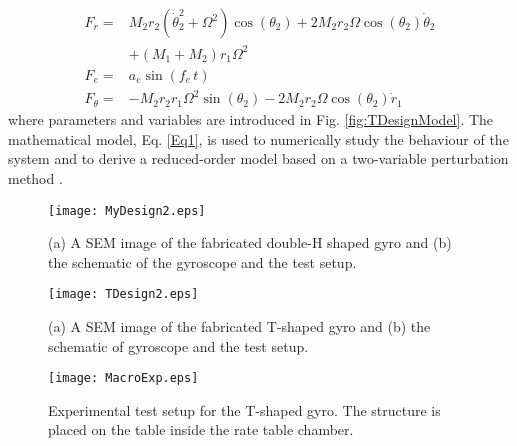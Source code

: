 \documentclass[twoside]{article}
\begin{document}
\begin{align}
F_r      = &  M_2 r_2 \left(\dot{\theta}_2^2 + \Omega^2 \right) \cos\left(\theta_2\right) + 2 M_2 r_2 \Omega \cos\left(\theta_2\right) \dot{\theta}_2 \nonumber\\
           &  + \left(M_1 + M_2 \right) r_1 \Omega^2 \nonumber \\
F_e  =  &   a_e \sin\left(f_e \, t\right) \nonumber \\
F_\theta =  &  -M_2  r_2 r_1  \Omega^2  \sin(\theta_2) - 2 M_2  r_2 \Omega \cos(\theta_2) \dot{r}_1 \nonumber
\end{align}
where parameters and variables are introduced in Fig. \ref{fig:TDesignModel}. The mathematical model, Eq. \eqref{Eq1}, is used to numerically study the behaviour of the system and to derive a reduced-order model based on a two-variable perturbation method \cite{Golnaraghi1989}. 

\begin{figure}[!b!] %
	\begin{center}
		\texttt{[image: MyDesign2.eps]}
		\caption{(a) A SEM image of the fabricated double-H shaped gyro and (b) the schematic of the gyroscope and the test setup.}
		\label{fig:MyDesign2}
	\end{center}
\end{figure}

\begin{figure}[!t!] %
	\begin{center}
		\texttt{[image: TDesign2.eps]}
		\caption{(a) A SEM image of the fabricated T-shaped gyro and (b) the schematic of gyroscope and the test setup.}
		\label{fig:TDesign2}
	\end{center}
\end{figure}


\begin{figure}[!h!] %
	\begin{center}
		\texttt{[image: MacroExp.eps]}
		\caption{Experimental test setup for the T-shaped gyro. The structure is placed on the table inside the rate table chamber.}
		\label{fig:MacroExp}
	\end{center}
\end{figure}
\end{document}

